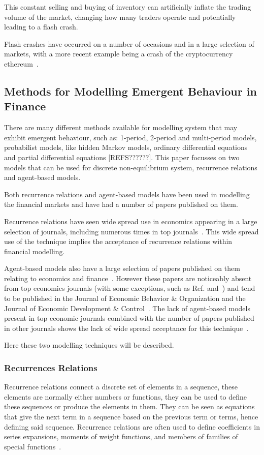 \documentclass{article}
\begin{document}
This constant selling and buying of inventory can artificially inflate the trading volume of the market, changing how many traders operate and potentially leading to a flash crash.

Flash crashes have occurred on a number of occasions and in a large selection of markets, with a more recent example being a crash of the cryptocurrency ethereum~\cite{cryptocrash}.


\subsection{Methods for Modelling Emergent Behaviour in Finance}  \label{litreviewofabmrr} 
There are many different methods available for modelling system that may exhibit emergent behaviour, such as: 1-period, 2-period and multi-period models, probabilist models, like hidden Markov models, ordinary differential equations and partial differential equations [REFS??????]. This paper focusses on two models that can be used for discrete non-equilibrium system, recurrence relations and agent-based models. 

Both recurrence relations and agent-based models have been used in modelling the financial markets and have had a number of papers published on them.

Recurrence relations have seen wide spread use in economics appearing in a large selection of journals, including numerous times in top journals~\cite{rra10, rra1, rra2, rra3, rra4, rra5, rra6, rra7, rra8, rra9}. This wide spread use of the technique implies the acceptance of recurrence relations within financial modelling.      

Agent-based models also have a large selection of papers published on them relating to economics and finance~\cite{ abma2, abma3, abma4}. However these papers are noticeably absent from top economics journals (with some exceptions, such as Ref.\cite{abmexp1} and~\cite{abmexp2}) and tend to be published in the Journal of Economic Behavior \& Organization and the Journal of Economic Development \& Control~\cite{whereabmp, farmerfoleynature}. The lack of agent-based models present in top economic journals combined with the number of papers published in other journals shows the lack of wide spread acceptance for this technique~\cite{agbntj}.

Here these two modelling techniques will be described.  


\subsubsection{Recurrences Relations} 
Recurrence relations connect a discrete set of elements in a sequence, these elements are normally either numbers or functions, they can be used to define these sequences or produce the elements in them. They can be seen as equations that give the next term in a sequence based on the previous term or terms, hence defining said sequence. Recurrence relations are often used to define coefficients in series expansions, moments of weight functions, and members of families of special functions~\cite{recurrelationbook}.
\end{document}
